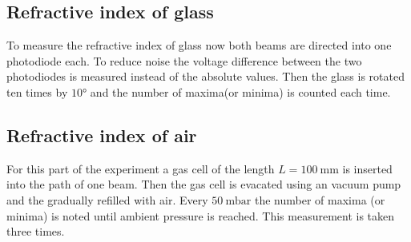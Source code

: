 \subsection{Refractive index of glass}
To measure the refractive index of glass now both beams are directed into one photodiode each. To reduce noise the voltage difference 
between the two photodiodes is measured instead of the absolute values. Then the glass is rotated ten times by $10°$ and the number of 
maxima(or minima) is counted each time.

\subsection{Refractive index of air}
For this part of the experiment a gas cell of the length $L = \SI{100}{\milli\meter}$ is inserted into the path of one beam. Then the 
gas cell is evacated using an vacuum pump and the gradually refilled with air. Every $\SI{50}{\milli\bar}$ the number of maxima (or minima)
is noted until ambient pressure is reached. This measurement is taken three times. 

